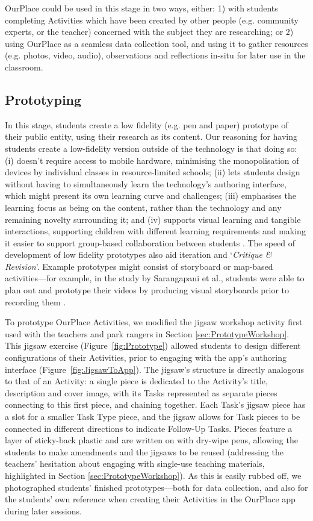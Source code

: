 OurPlace could be used in this stage in two ways, either: 1) with students completing Activities which have been created by other people (e.g. community experts, or the teacher) concerned with the subject they are researching; or 2) using OurPlace as a seamless data collection tool, and using it to gather resources (e.g. photos, video, audio), observations and reflections in-situ for later use in the classroom. 

\subsection{Prototyping}
In this stage, students create a low fidelity (e.g. pen and paper) prototype of their public entity, using their research as its content. Our reasoning for having students create a low-fidelity version outside of the technology is that doing so: (i) doesn't require access to mobile hardware, minimising the monopolisation of devices by individual classes in resource-limited schools; (ii) lets students design without having to simultaneously learn the technology's authoring interface, which might present its own learning curve and challenges; (iii) emphasises the learning focus as being on the content, rather than the technology \citep{Bell2010} and any remaining novelty surrounding it; and (iv) supports visual learning and tangible interactions, supporting children with different learning requirements and making it easier to support group-based collaboration between students \citep{Stanton2001}. The speed of development of low fidelity prototypes also aid iteration and `\textit{Critique \& Revision}'. Example prototypes might consist of storyboard or map-based activities---for example, in the study by Sarangapani et al., students were able to plan out and prototype their videos by producing visual storyboards prior to recording them \citep{Sarangapani2016}.

To prototype OurPlace Activities, we modified the jigsaw workshop activity first used with the teachers and park rangers in Section \ref{sec:PrototypeWorkshop}. This jigsaw exercise (Figure~\ref{fig:Prototype}) allowed students to design different configurations of their Activities, prior to engaging with the app's authoring interface (Figure~\ref{fig:JigsawToApp}). The jigsaw's structure is directly analogous to that of an Activity: a single piece is dedicated to the Activity's title, description and cover image, with its Tasks represented as separate pieces connecting to this first piece, and chaining together. Each Task's jigsaw piece has a slot for a smaller Task Type piece, and the jigsaw allows for Task pieces to be connected in different directions to indicate Follow-Up Tasks. Pieces feature a layer of sticky-back plastic and are written on with dry-wipe pens, allowing the students to make amendments and the jigsaws to be reused (addressing the teachers' hesitation about engaging with single-use teaching materials, highlighted in Section \ref{sec:PrototypeWorkshop}). As this is easily rubbed off, we photographed students' finished prototypes---both for data collection, and also for the students' own reference when creating their Activities in the OurPlace app during later sessions.

